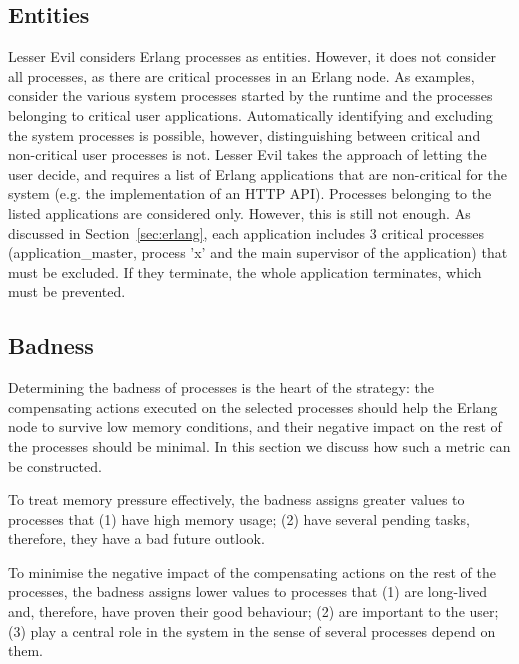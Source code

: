 \documentclass{llncs}
\begin{document}
\subsection{Entities}
\label{sec:entities}

Lesser Evil considers Erlang processes as entities. However, it does not consider all processes, as there are critical processes in an Erlang node. As examples, consider the various system processes started by the runtime and the processes belonging to critical user applications. Automatically identifying and excluding the system processes is possible, however, distinguishing between critical and non-critical user processes is not. Lesser Evil takes the approach of letting the user decide, and requires a list of Erlang applications that are non-critical for the system (e.g. the implementation of an HTTP API). Processes belonging to the listed applications are considered only. However, this is still not enough. As discussed in Section~\ref{sec:erlang}, each application includes 3 critical processes (application\_master, process 'x' and the main supervisor of the application) that must be excluded. If they terminate, the whole application terminates, which must be prevented. 

\subsection{Badness}
\label{sec:badness}

Determining the badness of processes is the heart of the strategy: the compensating actions executed on the selected processes should help the Erlang node to survive low memory conditions, and their negative impact on the rest of the processes should be minimal.  In this section we discuss how such a metric can be constructed.

To treat memory pressure effectively, the badness assigns greater values to processes that (1) have high memory usage; (2) have several pending tasks, therefore, they have a bad future outlook.

To minimise the negative impact of the compensating actions on the rest of the processes, the badness assigns lower values to processes that (1) are long-lived and, therefore, have proven their good behaviour; (2) are important to the user; (3) play a central role in the system in the sense of several processes depend on them.
\end{document}
